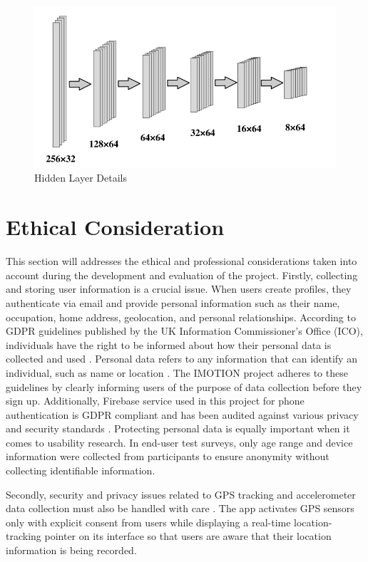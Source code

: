 \documentclass[12pt,two side]{report}
\begin{document}
\begin{figure}
\centering
\includegraphics[width=16cm]{background_report/figures/hidden layer.png}
\caption{Hidden Layer Details\cite{liang2019deep}}
\label{figure:8}
\end{figure}
\section{Ethical Consideration}
This section will addresses the ethical and professional considerations taken into account during the development and evaluation of the project. Firstly, collecting and storing user information is a crucial issue. When users create profiles, they authenticate via email and provide personal information such as their name, occupation, home address, geolocation, and personal relationships. According to GDPR guidelines published by the UK Information Commissioner's Office (ICO), individuals have the right to be informed about how their personal data is collected and used \cite{ico2024}. Personal data refers to any information that can identify an individual, such as name or location \cite{icoPersonalInfo}. The IMOTION project adheres to these guidelines by clearly informing users of the purpose of data collection before they sign up. Additionally, Firebase service used in this project for phone authentication is GDPR compliant and has been audited against various privacy and security standards \cite{firebasePrivacy2024}. Protecting personal data is equally important when it comes to usability research. In end-user test surveys, only age range and device information were collected from participants to ensure anonymity without collecting identifiable information.\newline

Secondly, security and privacy issues related to GPS tracking and accelerometer data collection must also be handled with care \cite{ico2024}. The app activates GPS sensors only with explicit consent from users while displaying a real-time location-tracking pointer on its interface so that users are aware that their location information is being recorded.\newline
\end{document}
